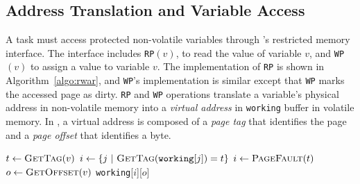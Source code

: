 

\subsection{Address Translation and Variable Access}

A task must access protected non-volatile variables through \sys's restricted memory interface. The interface includes \texttt{RP}$(v)$, to read the value of variable $v$, and \texttt{WP}$(v)$ to assign a value to variable $v$. The implementation of {\tt RP} is shown in Algorithm~\ref{algo:rwar}, and {\tt WP}'s implementation is similar except that {\tt WP} marks the accessed page as dirty. {\tt RP} and {\tt WP} operations translate a variable's physical address in non-volatile memory into a \emph{virtual address} in \texttt{working} buffer in volatile memory. In \sys, a virtual address is composed of a \emph{page tag} that identifies the page and a \emph{page offset} that identifies a byte.

\begin{algorithm}[t]
    \label{algo:rwar}
    \scriptsize
    \begin{algorithmic}[1]
		\State $t \leftarrow \Call{GetTag}{v}$
        \State $i \gets \{ j\ |\ \Call{GetTag}{\texttt{working}[j]} = t \}$ 
		 
		\State	$i \gets \Call{PageFault}{t}$ 
		\EndIf
		\State $o \leftarrow \Call{GetOffset}{v}$
		\State \Return \texttt{working}[$i$][$o$]  
	\end{algorithmic}
\end{algorithm}

